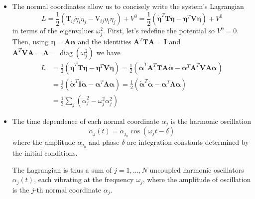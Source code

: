 \documentclass[11pt, a4paper]{article}
\newcommand{\bdot}[1]{\dot{\bm{#1}}} %
\newcommand{\mat}[1]{\mathbf{#1}} %
\begin{document}
\begin{itemize}
	\item The normal coordinates allow us to concisely write the system's Lagrangian
	\begin{equation*}
		L = \frac{1}{2} \left( \mathrm{T}_{ij}\dot{\eta}_{i}\dot{\eta}_{j} - \mathrm{V}_{ij}\eta_{i}\eta_{j} \right) + V^{0} =  \frac{1}{2}\left(\bdot{\eta}^{T} \mat{T} \bdot{\eta} - \bm{\eta}^{T} \mat{V} \bm{\eta}\right) + V^{0}
	\end{equation*}
	in terms of the eigenvalues $ \omega_{j}^{2} $. First, let's redefine the potential so $ V^{0} = 0$. Then, using $ \bm{\eta} = \mat{A} \bm{\alpha}  $ and the identities $ \mat{A}^{T} \mat{T} \mat{A} = \mat{I} $ and $  \mat{A}^{T} \mat{V} \mat{A} = \mat{\Lambda} = \operatorname{diag}(\omega_{j}^{2}) $ we have
	\begin{align*}
		L &= \frac{1}{2}\left(\bdot{\eta}^{T} \mat{T} \bdot{\eta} - \bm{\eta}^{T} \mat{V} \bm{\eta}\right) = \frac{1}{2} \left( \bdot{\alpha}^{T} \mat{A}^{T} \mat{T} \mat{A} \bdot{\alpha} - \bm{\alpha}^{T} \mat{A}^{T} \mat{V} \mat{A} \bm{\alpha} \right)\\
		&=\frac{1}{2}\left(\bdot{\alpha}^{T} \mat{I} \bdot{\alpha} - \bm{\alpha}^{T} \mat{\Lambda} \bm{\alpha}\right) =\frac{1}{2}\left(\bdot{\alpha}^{T} \bdot{\alpha} - \bm{\alpha}^{T} \mat{\Lambda} \bm{\alpha}\right)\\
		&=\frac{1}{2}\sum_{j}\left(\dot{\alpha}_{j}^{2} - \omega_{j}^{2} \alpha_{j}^{2} \right)
	\end{align*}
	
	\item The time dependence of each normal coordinate $ \alpha_{j} $ is the harmonic oscillation
	\begin{equation*}
		\alpha_{j}(t) = \alpha_{j_{0}} \cos(\omega_{j}t - \delta)
	\end{equation*}
	where the amplitude $ \alpha_{j_{0}} $ and phase $ \delta $ are integration constants determined by the initial conditions.
	
	The Lagrangian is thus a sum of $ j = 1, \ldots, N$ uncoupled harmonic oscillators $ \alpha_{j}(t) $, each vibrating at the frequency $ \omega_{j} $, where the amplitude of oscillation is the $ j $-th normal coordinate $ \alpha_{j} $. 
	

\end{itemize}
\end{document}
